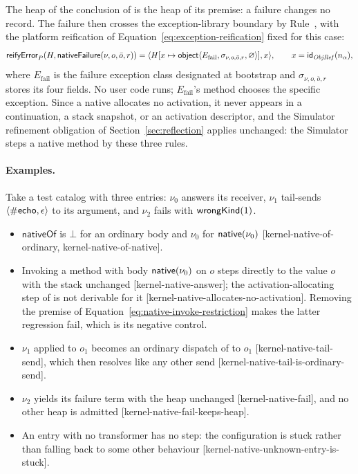 The heap of the conclusion of  is the heap of its
premise: a failure changes no record.  The failure then crosses the
exception-library boundary by Rule~, with the
platform reification of Equation~\eqref{eq:exception-reification} fixed for
this case:
\begin{equation}\label{eq:native-failure-reification}
 \mathsf{reifyError}_P(H,\mathsf{nativeFailure}(\nu,o,\bar o,r))
   =\langle H[x\mapsto\mathsf{object}\langle E_{\mathrm{fail}},
       \sigma_{\nu,o,\bar o,r},\varnothing\rangle],x\rangle,
 \qquad x=\mathsf{id}_{\mathit{ObjRef}}(n_\alpha),
\end{equation}
where $E_{\mathrm{fail}}$ is the failure exception class designated at
bootstrap and $\sigma_{\nu,o,\bar o,r}$ stores its four fields.  No user code
runs; $E_{\mathrm{fail}}$'s  method chooses the specific exception.
Since a native allocates no activation, it never appears in a continuation, a
stack snapshot, or an activation descriptor, and the Simulator refinement
obligation of Section~\ref{sec:reflection} applies unchanged: the Simulator
steps a native method by these three rules.

\paragraph{Examples.}
Take a test catalog with three entries: $\nu_0$ answers its receiver,
$\nu_1$ tail-sends $\langle\#\mathsf{echo},\epsilon\rangle$ to its argument, and
$\nu_2$ fails with $\mathsf{wrongKind}(1)$.
\begin{itemize}
\item $\mathsf{nativeOf}$ is $\bot$ for an ordinary body and $\nu_0$ for
      $\mathsf{native}(\nu_0)$
      [kernel-native-of-ordinary, kernel-native-of-native].
\item Invoking a method with body $\mathsf{native}(\nu_0)$ on $o$ steps directly to
      the value $o$ with the stack unchanged [kernel-native-answer]; the
      activation-allocating step of  is not
      derivable for it [kernel-native-allocates-no-activation].  Removing the
      premise of Equation~\eqref{eq:native-invoke-restriction} makes the
      latter regression fail, which is its negative control.
\item $\nu_1$ applied to $o_1$ becomes an ordinary dispatch of  to
      $o_1$ [kernel-native-tail-send], which then resolves like any other send
      [kernel-native-tail-is-ordinary-send].
\item $\nu_2$ yields its failure term with the heap unchanged
      [kernel-native-fail], and no other heap is admitted
      [kernel-native-fail-keeps-heap].
\item An entry with no transformer has no step: the configuration is stuck
      rather than falling back to some other behaviour
      [kernel-native-unknown-entry-is-stuck].
\end{itemize}

